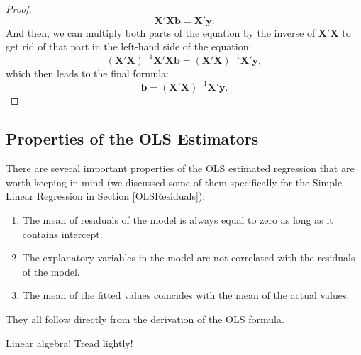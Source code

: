 \documentclass[
]{book}
\providecommand{\tightlist}{%
  \setlength{\itemsep}{0pt}\setlength{\parskip}{0pt}}
\theoremstyle{definition}
\theoremstyle{definition}
\theoremstyle{definition}
\theoremstyle{definition}
\theoremstyle{remark}
\begin{document}
\begin{proof}
\begin{equation*}
    \mathbf{X}' \mathbf{X} \mathbf{b} = \mathbf{X}' \mathbf{y}.
\end{equation*}
And then, we can multiply both parts of the equation by the inverse of \(\mathbf{X}' \mathbf{X}\) to get rid of that part in the left-hand side of the equation:
\begin{equation*}
    (\mathbf{X}' \mathbf{X})^{-1} \mathbf{X}' \mathbf{X} \mathbf{b} = (\mathbf{X}' \mathbf{X})^{-1} \mathbf{X}' \mathbf{y},
\end{equation*}
which then leads to the final formula:
\begin{equation*}
    \mathbf{b} = \left(\mathbf{X}' \mathbf{X}\right)^{-1} \mathbf{X}' \mathbf{y} .
\end{equation*}
\end{proof}

\subsection{Properties of the OLS Estimators}\label{properties-of-the-ols-estimators}

There are several important properties of the OLS estimated regression that are worth keeping in mind (we discussed some of them specifically for the Simple Linear Regression in Section \ref{OLSResiduals}):

\begin{enumerate}
\def\labelenumi{\arabic{enumi}.}
\tightlist
\item
  The mean of residuals of the model is always equal to zero as long as it contains intercept.
\item
  The explanatory variables in the model are not correlated with the residuals of the model.
\item
  The mean of the fitted values coincides with the mean of the actual values.
\end{enumerate}

They all follow directly from the derivation of the OLS formula.

Linear algebra! Tread lightly!
\end{document}
